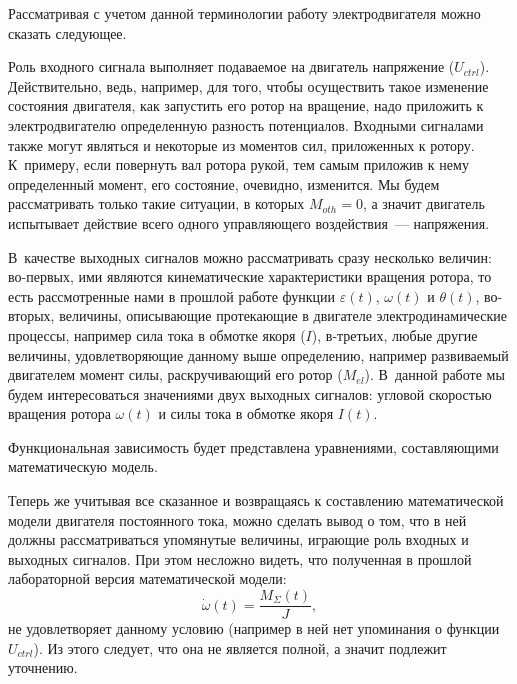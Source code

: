 \documentclass[12pt, a4paper, openany]{extarticle}
\begin{document}
Рассматривая с учетом данной терминологии работу электродвигателя можно сказать следующее.

Роль входного сигнала выполняет подаваемое на двигатель напряжение ($U_{ctrl}$).
Действительно, ведь, например, для того, чтобы осуществить такое изменение состояния двигателя, как запустить его ротор на вращение, надо приложить к электродвигателю определенную разность потенциалов.
Входными сигналами также могут являться и некоторые из моментов сил, приложенных к ротору.
К~примеру, если повернуть вал ротора рукой, тем самым приложив к нему определенный момент, его состояние, очевидно, изменится.
Мы будем рассматривать только такие ситуации, в которых $M_{oth} = 0$, а значит двигатель испытывает действие всего одного управляющего воздействия~--- напряжения. 

В~качестве выходных сигналов можно рассматривать сразу несколько величин: во-первых, ими являются кинематические характеристики вращения ротора, то есть рассмотренные нами в прошлой работе функции $\varepsilon(t)$, $\omega(t)$ и $\theta(t)$, во-вторых, величины, описывающие протекающие в двигателе электродинамические процессы, например сила тока в обмотке якоря ($I$), в-третьих, любые другие величины, удовлетворяющие данному выше определению, например развиваемый двигателем момент силы, раскручивающий его ротор ($M_{el}$).
В~данной работе мы будем интересоваться значениями двух выходных сигналов: угловой скоростью вращения ротора $\omega(t)$ и силы тока в обмотке якоря $I(t)$.

Функциональная зависимость будет представлена уравнениями, составляющими математическую модель.

Теперь же учитывая все сказанное и возвращаясь к составлению математической модели двигателя постоянного тока, можно сделать вывод о том, что в ней должны рассматриваться упомянутые величины, играющие роль входных и выходных сигналов.
При этом несложно видеть, что полученная в прошлой лабораторной версия математической модели: 
\begin{equation}\label{from_lab_1}
	\dot{\omega}(t)=\frac{M_\varSigma(t)}J,
\end{equation}
не удовлетворяет данному условию (например в ней нет упоминания о функции $U_{ctrl}$).
Из этого следует, что она не является полной, а значит подлежит уточнению. 
\end{document}
